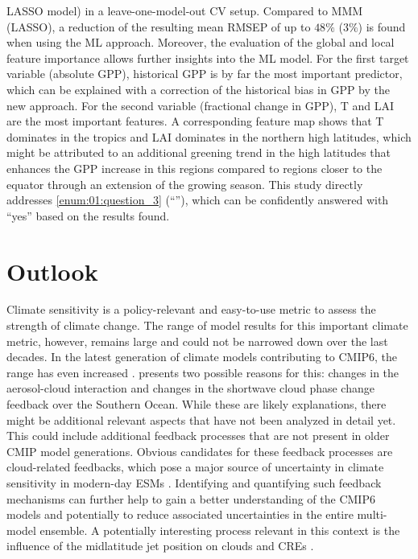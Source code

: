\ac{LASSO} model) in a leave-one-model-out \ac{CV} setup. Compared to \ac{MMM}
(\ac{LASSO}), a reduction of the resulting mean \ac{RMSEP} of up to $48
\unit{\%}$ ($3 \unit{\%}$) is found when using the \ac{ML} approach. Moreover,
the evaluation of the global and local feature importance allows further
insights into the \ac{ML} model. For the first target variable (absolute
\ac{GPP}), historical \ac{GPP} is by far the most important predictor, which
can be explained with a correction of the historical bias in \ac{GPP} by the
new approach. For the second variable (fractional change in \ac{GPP}), \ac{T}
and \ac{LAI} are the most important features. A corresponding feature map shows
that \ac{T} dominates in the tropics and \ac{LAI} dominates in the northern
high latitudes, which might be attributed to an additional greening trend in
the high latitudes that enhances the \ac{GPP} increase in this regions compared
to regions closer to the equator through an extension of the growing season.
This study directly addresses \cref{enum:01:question_3}
(\enquote{\KeyScienceQuestionThree{}}), which can be confidently answered with
\enquote{yes} based on the results found.


\section{Outlook}
\label{sec:07:outlook}

Climate sensitivity is a policy-relevant and easy-to-use metric to assess the
strength of climate change. The range of model results for this important
climate metric, however, remains large and could not be narrowed down over the
last decades. In the latest generation of climate models contributing to
\acs{CMIP}6, the range has even increased \autocite{Meehl2020}.
 presents two possible reasons for this:
changes in the aerosol-cloud interaction and changes in the shortwave cloud
phase change feedback over the Southern Ocean. While these are likely
explanations, there might be additional relevant aspects that have not been
analyzed in detail yet. This could include additional feedback processes that
are not present in older \ac{CMIP} model generations. Obvious candidates for
these feedback processes are cloud-related feedbacks, which pose a major source
of uncertainty in climate sensitivity in modern-day \acp{ESM}
\autocite{Boucher2013}. Identifying and quantifying such feedback mechanisms
can further help to gain a better understanding of the \acs{CMIP}6 models and
potentially to reduce associated uncertainties in the entire multi-model
ensemble. A potentially interesting process relevant in this context is the
influence of the midlatitude jet position on clouds and \acp{CRE}
\autocite{Grise2016}.

